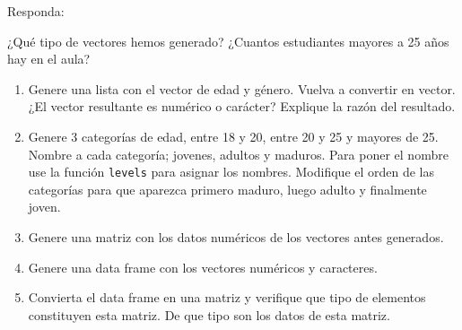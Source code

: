 \documentclass[]{article}
\begin{document}
Responda:

¿Qué tipo de vectores hemos generado? ¿Cuantos estudiantes mayores a 25
años hay en el aula?

\begin{enumerate}
\def\labelenumi{\arabic{enumi}.}
\setcounter{enumi}{4}
\item
  Genere una lista con el vector de edad y género. Vuelva a convertir en
  vector. ¿El vector resultante es numérico o carácter? Explique la
  razón del resultado.
\item
  Genere 3 categorías de edad, entre 18 y 20, entre 20 y 25 y mayores de
  25. Nombre a cada categoría; jovenes, adultos y maduros. Para poner el
  nombre use la función \texttt{levels} para asignar los nombres.
  Modifique el orden de las categorías para que aparezca primero maduro,
  luego adulto y finalmente joven.
\item
  Genere una matriz con los datos numéricos de los vectores antes
  generados.
\item
  Genere una data frame con los vectores numéricos y caracteres.
\item
  Convierta el data frame en una matriz y verifique que tipo de
  elementos constituyen esta matriz. De que tipo son los datos de esta
  matriz.
\end{enumerate}
\end{document}
